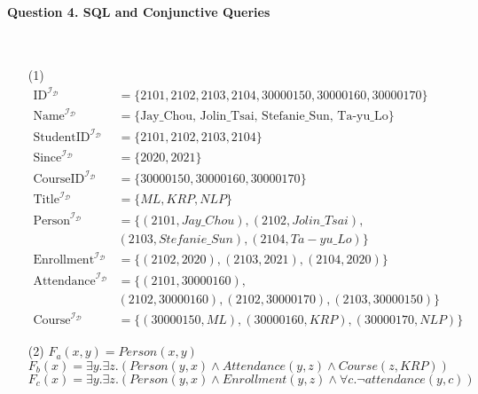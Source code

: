 \documentclass[12pt]{article}
\begin{document}
    \paragraph{Question 4. SQL and Conjunctive Queries}~{}
    \\
    \begin{enumerate}
        \item [(1)]
        \begin{align*}
            \text{ID}^{\mathcal{I}_\mathcal{D}} &= \{2101, 2102, 2103, 2104, 30000150, 30000160, 30000170\} \\
            \text{Name}^{\mathcal{I}_{\mathcal{D}}} &= \{ \text{Jay\_Chou, Jolin\_Tsai, Stefanie\_Sun, Ta-yu\_Lo} \} \\
            \text{StudentID}^{\mathcal{I}_{\mathcal{D}}} &= \{ 2101, 2102, 2103, 2104 \} \\
            \text{Since}^{\mathcal{I}_{\mathcal{D}}} &= \{ 2020, 2021 \} \\
            \text{CourseID}^{\mathcal{I}_{\mathcal{D}}} &= \{ 30000150, 30000160, 30000170 \} \\
            \text{Title}^{\mathcal{I}_{\mathcal{D}}} &= \{ ML, KRP, NLP \} \\
            \text{Person}^{\mathcal{I}_{\mathcal{D}}} &= \{ (2101, Jay\_Chou), (2102, Jolin\_Tsai), \\& (2103, Stefanie\_Sun), (2104, Ta-yu\_Lo) \} \\
            \text{Enrollment}^{\mathcal{I}_{\mathcal{D}}} &= \{ (2102, 2020), (2103, 2021), (2104, 2020) \} \\
            \text{Attendance}^{\mathcal{I}_{\mathcal{D}}} &= \{ (2101, 30000160), \\ &(2102, 30000160), (2102, 30000170), (2103, 30000150) \} \\
            \text{Course}^{\mathcal{I}_{\mathcal{D}}} &= \{ (30000150, ML), (30000160, KRP), (30000170, NLP) \}
        \end{align*}
        \item [(2)]
        $F_a(x, y) = Person(x, y)$ \\
        $F_b(x) = \exists y.\exists z.(Person(y, x) \wedge Attendance(y, z) \wedge Course(z, KRP))$ \\
        $F_c(x) = \exists y.\exists z.(Person(y, x) \wedge Enrollment(y, z) \wedge \forall c.\neg attendance(y, c))$


\end{enumerate}
\end{document}
